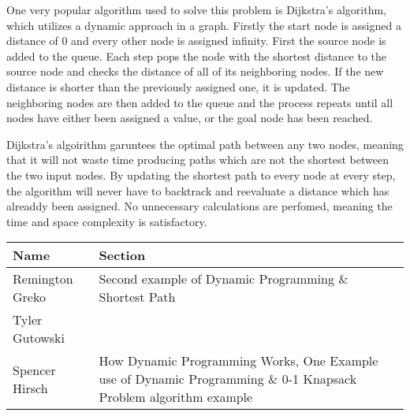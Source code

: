 \documentclass{article}
\begin{document}
One very popular algorithm used to solve this problem is Dijkstra's algorithm, 
which utilizes a dynamic approach in a graph. Firstly the start node is assigned 
a distance of 0 and every other node is assigned infinity. First the source node
is added to the queue. Each step pops the node with the shortest distance to the
source node and checks the distance of all of its neighboring nodes. If the 
new distance is shorter than the previously assigned one, it is updated. The 
neighboring nodes are then added to the queue and the process repeats until 
all nodes have either been assigned a value, or the goal node has been reached.

Dijkstra's algoirithm garuntees the optimal path between any two nodes, meaning 
that it will not waste time producing paths which are not the shortest between
the two input nodes. By updating the shortest path to every node at every step, 
the algorithm will never have to backtrack and reevaluate a distance which
has alreaddy been assigned. No unnecessary calculations are perfomed, meaning 
the time and space complexity is satisfactory.


\pagebreak

\begin{center}
        \begin{tabular}{|p{3cm}|p{6cm}|}
            \hline
            \textbf{Name} & \textbf{Section} \\
            \hline
            Remington Greko & Second example of Dynamic Programming $\&$ Shortest Path\\
            \hline
            Tyler Gutowski &  \\
            \hline
            Spencer Hirsch & How Dynamic Programming Works, One Example use of Dynamic Programming $\&$ 0-1 Knapsack Problem algorithm example \\
            \hline
        \end{tabular}
    \end{center}
    
\end{document}
